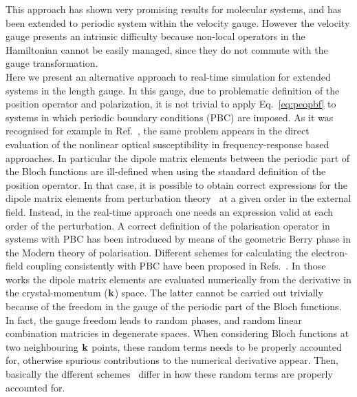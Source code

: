 This approach has shown very promising results for molecular systems, and has been extended to periodic system within the velocity gauge.\cite{tancogne2020octopus,noda2019salmon} However the velocity gauge presents an intrinsic difficulty because non-local operators in the Hamiltonian cannot be easily managed, since they do not commute with the gauge transformation.\cite{tokman} \\
Here we present an alternative approach to real-time simulation for extended systems in the length gauge.
In this gauge, due to problematic definition of the position operator and polarization, it is not trivial to apply Eq.~\eqref{eq:peopbf} to systems in which periodic boundary conditions (PBC) are imposed. As it was recognised for example in Ref.~, the same problem appears in the direct evaluation of the nonlinear optical susceptibility in frequency-response based approaches. In particular the dipole matrix elements between the periodic part of the Bloch functions are ill-defined when using the standard definition of the  position operator. In that case, it is possible to obtain correct expressions for the dipole matrix elements from perturbation theory~\cite{PhysRevB.52.14636,PhysRevB.48.11705,PhysRevB.82.235201,korbel2015optical} at a given order in the external field. Instead, in the real-time approach one needs an expression valid at each order of the perturbation.
A correct definition of the polarisation operator in systems with PBC has been introduced by means of the geometric Berry phase in the Modern theory of polarisation.\cite{RevModPhys.66.899} 
Different schemes for calculating the electron-field coupling consistently with PBC have been proposed in Refs.~\cite{springborg, PhysRevB.76.035213, souza_prb, korbel2015optical}. In those works the dipole matrix elements are evaluated numerically from the derivative in the crystal-momentum (${\bf k}$) space. The latter cannot be carried out trivially because of the freedom in the gauge of the periodic part of the Bloch functions. In fact, the gauge freedom leads to random phases, and random linear combination matricies in degenerate spaces. When considering Bloch functions at two neighbouring ${\bf k}$ points, these random terms needs to be properly accounted for, otherwise spurious contributions to the numerical derivative appear.
Then, basically the dfferent schemes~\cite{springborg, PhysRevB.76.035213, souza_prb, korbel2015optical} differ in how these random terms are properly accounted for.

